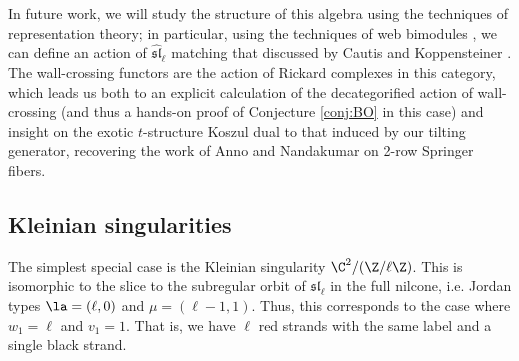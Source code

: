 In future work, we will study the structure of this algebra using the techniques of representation theory; in particular, using the techniques of web bimodules \cite{Webweb}, we can define an action of $\mathfrak{\widehat{sl}}_\ell$ matching that discussed by Cautis and Koppensteiner \cite{CKexotic}.  The wall-crossing functors are the action of Rickard complexes in this category, which leads us both to an explicit calculation of the decategorified action of wall-crossing (and thus a hands-on proof of Conjecture \ref{conj:BO} in this case) and insight on the exotic $t$-structure Koszul dual to that induced by our tilting generator, recovering the work of Anno and Nandakumar \cite{Anno,ANexotic} on 2-row Springer fibers.

\subsection{Kleinian singularities}

The simplest special case is the Kleinian singularity $\C^2/(\Z/\ell\Z)$.  This is isomorphic to the slice to the subregular orbit of $\mathfrak{sl}_\ell$ in the full nilcone, i.e. Jordan types $\la=(\ell,0)$ and $\mu=(\ell-1,1)$.  Thus, this corresponds to the case where $w_1=\ell$ and $v_1=1$.  That is, we have $\ell$ red strands with the same label and a single black strand.

